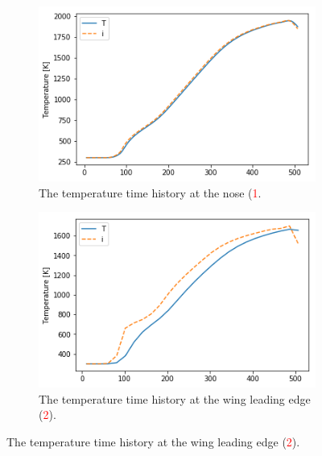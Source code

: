 






\begin{figure}[ht]
	\begin{subfigure}{.5\textwidth}
		\centering
		\includegraphics[width=0.99\linewidth]{figures/A1_uncertainty-analysis/TNose}
		\caption{The temperature time history at the nose (\textcolor{red}{1}.}

	\end{subfigure}
	\begin{subfigure}{.5\textwidth}
		\centering
		\includegraphics[width=0.99\linewidth]{figures/A1_uncertainty-analysis/TLE}
		\caption{The temperature time history at the wing leading edge (\textcolor{red}{2}).}


\end{subfigure}
\end{figure}
